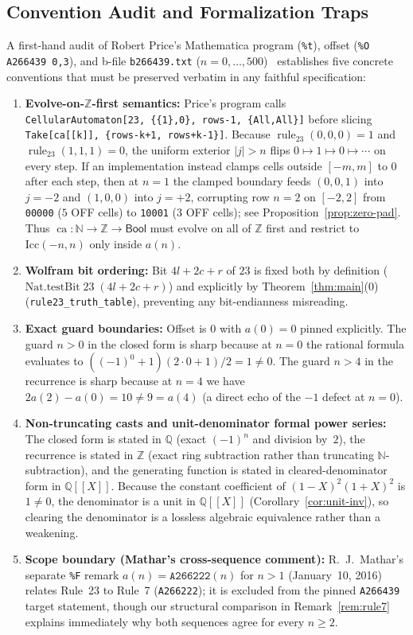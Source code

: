 \documentclass[11pt]{article}
\newcommand{\llbracket}{[\![}
\newcommand{\rrbracket}{]\!]}
\theoremstyle{definition}
\newcommand{\N}{\mathbb{N}}
\newcommand{\Z}{\mathbb{Z}}
\newcommand{\Q}{\mathbb{Q}}
\newcommand{\seq}[1]{\texttt{#1}}
\newcommand{\ruleTT}{\operatorname{rule}_{23}}
\newcommand{\ca}{\operatorname{ca}}
\begin{document}
\subsection{Convention Audit and Formalization Traps}
\label{sec:conventions}

A first-hand audit of Robert Price's Mathematica program (\texttt{\%t}), offset (\texttt{\%O A266439 0,3}), and b-file \texttt{b266439.txt} ($n = 0, \dots, 500$)~\cite{oeis266439} establishes five concrete conventions that must be preserved verbatim in any faithful specification:
\begin{enumerate}
\item \textbf{Evolve-on-$\Z$-first semantics:} Price's program calls \texttt{CellularAutomaton[23, \{\{1\},0\}, rows-1, \{All,All\}]} before slicing \texttt{Take[ca[[k]], \{rows-k+1, rows+k-1\}]}. Because $\ruleTT(0,0,0) = 1$ and $\ruleTT(1,1,1) = 0$, the uniform exterior $|j| > n$ flips $0 \mapsto 1 \mapsto 0 \mapsto \cdots$ on every step. If an implementation instead clamps cells outside $[-m, m]$ to $0$ after each step, then at $n = 1$ the clamped boundary feeds $(0,0,1)$ into $j = -2$ and $(1,0,0)$ into $j = +2$, corrupting row $n = 2$ on $[-2, 2]$ from \texttt{00000} ($5$ OFF cells) to \texttt{10001} ($3$ OFF cells); see Proposition~\ref{prop:zero-pad}. Thus $\ca : \N \to \Z \to \mathsf{Bool}$ must evolve on all of $\Z$ first and restrict to $\mathrm{Icc}(-n, n)$ only inside $a(n)$.
\item \textbf{Wolfram bit ordering:} Bit $4l + 2c + r$ of $23$ is fixed both by definition ($\mathrm{Nat.testBit}\;23\;(4l + 2c + r)$) and explicitly by Theorem~\ref{thm:main}(0) (\texttt{rule23\_truth\_table}), preventing any bit-endianness misreading.
\item \textbf{Exact guard boundaries:} Offset is $0$ with $a(0) = 0$ pinned explicitly. The guard $n > 0$ in the closed form is sharp because at $n = 0$ the rational formula evaluates to $((-1)^0 + 1)(2\cdot 0 + 1)/2 = 1 \ne 0$. The guard $n > 4$ in the recurrence is sharp because at $n = 4$ we have $2a(2) - a(0) = 10 \ne 9 = a(4)$ (a direct echo of the $-1$ defect at $n = 0$).
\item \textbf{Non-truncating casts and unit-denominator formal power series:} The closed form is stated in $\Q$ (exact $(-1)^n$ and division by~$2$), the recurrence is stated in $\Z$ (exact ring subtraction rather than truncating $\N$-subtraction), and the generating function is stated in cleared-denominator form in $\Q\llbracket X \rrbracket$. Because the constant coefficient of $(1 - X)^2(1 + X)^2$ is $1 \ne 0$, the denominator is a unit in $\Q\llbracket X \rrbracket$ (Corollary~\ref{cor:unit-inv}), so clearing the denominator is a lossless algebraic equivalence rather than a weakening.
\item \textbf{Scope boundary (Mathar's cross-sequence comment):} R.~J.\ Mathar's separate \texttt{\%F} remark $a(n) = \seq{A266222}(n)$ for $n > 1$ (January~10, 2016) relates Rule~23 to Rule~7 (\seq{A266222}); it is excluded from the pinned \seq{A266439} target statement, though our structural comparison in Remark~\ref{rem:rule7} explains immediately why both sequences agree for every $n \ge 2$.
\end{enumerate}
\end{document}
